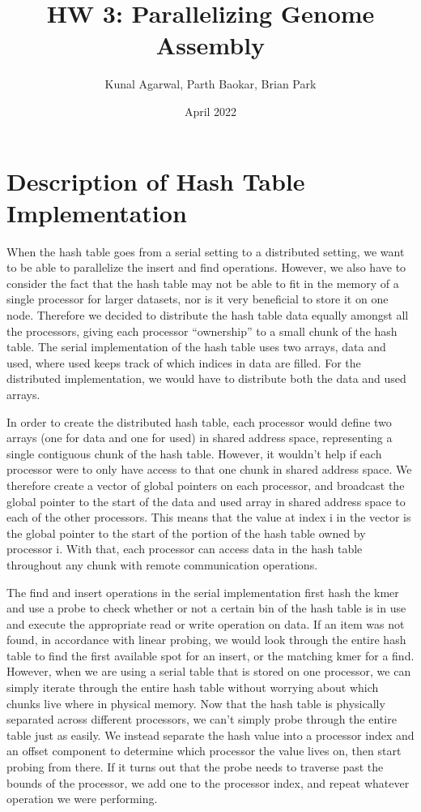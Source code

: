 \documentclass{article}
\title{HW 3: Parallelizing Genome Assembly}
\author{Kunal Agarwal, Parth Baokar, Brian Park}
\date{April 2022}
\begin{document}
\maketitle

\section{Description of Hash Table Implementation}

When the hash table goes from a serial setting to a distributed setting, we want to be able to parallelize the insert and find operations. However, we also have to consider the fact that the hash table may not be able to fit in the memory of a single processor for larger datasets, nor is it very beneficial to store it on one node. Therefore we decided to distribute the hash table data equally amongst all the processors, giving each processor “ownership” to a small chunk of the hash table. The serial implementation of the hash table uses two arrays, data and used, where used keeps track of which indices in data are filled. For the distributed implementation, we would have to distribute both the data and used arrays.

In order to create the distributed hash table, each processor would define two arrays (one for data and one for used) in shared address space, representing a single contiguous chunk of the hash table. However, it wouldn’t help if each processor were to only have access to that one chunk in shared address space. We therefore create a vector of global pointers on each processor, and broadcast the global pointer to the start of the data and used array in shared address space to each of the other processors. This means that the value at index i in the vector is the global pointer to the start of the portion of the hash table owned by processor i. With that, each processor can access data in the hash table throughout any chunk with remote communication operations.

The find and insert operations in the serial implementation first hash the kmer and use a probe to check whether or not a certain bin of the hash table is in use and execute the appropriate read or write operation on data. If an item was not found, in accordance with linear probing, we would look through the entire hash table to find the first available spot for an insert, or the matching kmer for a find. However, when we are using a serial table that is stored on one processor, we can simply iterate through the entire hash table without worrying about which chunks live where in physical memory. Now that the hash table is physically separated across different processors, we can’t simply probe through the entire table just as easily. We instead separate the hash value into a processor index and an offset component to determine which processor the value lives on, then start probing from there. If it turns out that the probe needs to traverse past the bounds of the processor, we add one to the processor index, and repeat whatever operation we were performing.
\end{document}
